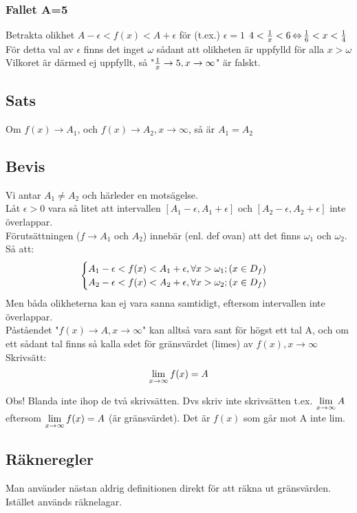 \documentclass{article}
\begin{document}
\subsubsection{Fallet A=5}
Betrakta olikhet $A-\epsilon < f(x) < A+\epsilon$ för (t.ex.) $\epsilon=1$
$4 < \frac{1}{x} < 6 \operatorname{\Leftrightarrow} \frac{1}{6} < x < \frac{1}{4}$
För detta val av $\epsilon$ finns det inget $\omega$ sådant att olikheten är uppfylld för alla $x>\omega$ Vilkoret är därmed ej uppfyllt, så
"$\frac{1}{x} \to 5, x\to\infty$" är falskt.

\subsection{Sats}

Om $f(x)\to A_1$, och $f(x)\to A_2, x\to\infty$, så är $A_1 = A_2$

\subsection{Bevis}
Vi antar $A_1\neq A_2$ och härleder en motsägelse.\\
Låt $\epsilon>0$ vara så litet att intervallen $\left[ A_1 - \epsilon , A_1 + \epsilon \right]$ och $\left[ A_2 - \epsilon , A_2 + \epsilon \right]$ inte överlappar.\\
Förutsättningen ($f\to A_1$ och $A_2$) innebär (enl. def ovan) att det finns $\omega_1$ och $\omega_2$.\\
Så att:
$$
\begin{cases}
  A_1-\epsilon < f(x) < A_1+\epsilon, \forall x>\omega_1; (x\in D_f)\\
  A_2-\epsilon < f(x) < A_2+\epsilon, \forall x>\omega_2; (x\in D_f)\\
\end{cases}
$$
Men båda olikheterna kan ej vara sanna samtidigt, eftersom intervallen inte överlappar.\\
Påståendet "$f(x)\to A, x\to\infty$" kan alltså vara sant för högst ett tal A, och om ett sådant tal finns så kalla sdet för gränsvärdet (limes) av $f(x), x\to\infty$
Skrivsätt:
$$\displaystyle \lim_{x \rightarrow \infty}f(x) = A$$

Obs! Blanda inte ihop de två skrivsätten. Dvs skriv inte skrivsätten t.ex. $\displaystyle \lim_{x \rightarrow \infty} A$ eftersom $\displaystyle \lim_{x \rightarrow \infty} f(x) = A$ (är gränsvärdet).
Det är $f(x)$ som går mot A inte lim.

\subsection{Räkneregler}
Man använder nästan aldrig definitionen direkt för att räkna ut gränsvärden. Istället används räknelagar.
\end{document}
